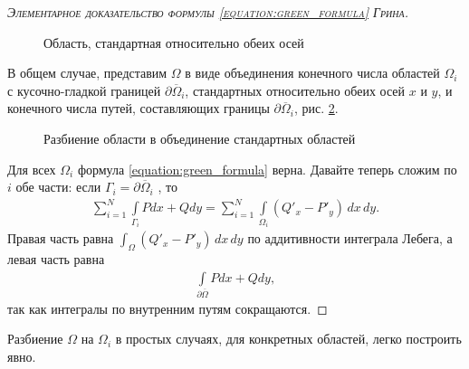 \begin{proof}[\normalfont\textsc{Элементарное доказательство формулы \eqref{equation:green_formula} Грина}]
\begin{figure}[ht]
    \centering
    \caption{Область, стандартная относительно обеих осей}
    \label{fig:oblast_standard_on_both_axis}
\end{figure}

В общем случае, представим $\Omega$ в виде объединения конечного числа областей $\Omega_i$ с кусочно-гладкой границей $\partial \overline \Omega_i$, стандартных относительно обеих осей $x$ и $y$, и конечного числа путей, составляющих границы $\partial \overline \Omega_i$, рис. \ref{fig:oblast_union_of_standard_oblasts}.

\begin{figure}[ht]
    \centering
    \caption{Разбиение области в объединение стандартных областей}
    \label{fig:oblast_union_of_standard_oblasts}
\end{figure}

Для всех $\Omega_i$ формула  \eqref{equation:green_formula} верна. Давайте теперь сложим по  $i$  обе части: если $\Gamma_i = \partial \overline \Omega_i$ , то 
\begin{align*}
 \sum_{i=1}^{N} \int\limits_{\Gamma_i} P dx + Q dy = \sum_{i=1}^{N} \int\limits_{\Omega_i} (Q'_x - P'_y) \, dx \, dy 
.\end{align*} Правая часть равна $\int_{\Omega} (Q'_x - P'_y) \, dx \,dy  $  по аддитивности интеграла Лебега, а левая часть равна
\begin{align*}
 \int\limits_{\partial \overline \Omega} P dx + Q dy
,\end{align*}  так как интегралы по внутренним путям сокращаются.

\end{proof}
\begin{remrk*}
 Разбиение $\Omega$ на $\Omega_i$ в простых случаях, для конкретных областей, легко построить явно.
\end{remrk*}

